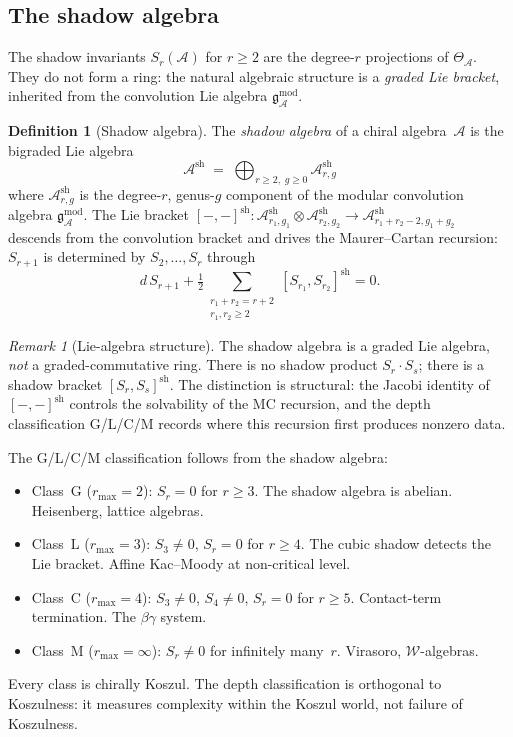 \documentclass[11pt,reqno]{amsart}
\theoremstyle{definition}
\newtheorem{definition}[theorem]{Definition}
\theoremstyle{remark}
\newtheorem{remark}[theorem]{Remark}
\newcommand{\cA}{\mathcal{A}}
\newcommand{\cW}{\mathcal{W}}
\newcommand{\fg}{\mathfrak{g}}
\numberwithin{equation}{section}
\begin{document}
\subsection{The shadow algebra}

The shadow invariants $S_r(\cA)$ for $r \geq 2$ are the
degree-$r$ projections of $\Theta_\cA$. They do not form a ring:
the natural algebraic structure is a \emph{graded Lie bracket},
inherited from the convolution Lie algebra
$\fg^{\mathrm{mod}}_\cA$.

\begin{definition}[Shadow algebra]
\label{def:kfc-shadow-algebra}
The \emph{shadow algebra} of a chiral algebra~$\cA$ is the
bigraded Lie algebra
\[
\cA^{\mathrm{sh}} \;=\;
\bigoplus_{r \geq 2,\; g \geq 0} \cA^{\mathrm{sh}}_{r,g}
\]
where $\cA^{\mathrm{sh}}_{r,g}$ is the degree-$r$, genus-$g$
component of the modular convolution algebra
$\fg^{\mathrm{mod}}_\cA$. The Lie bracket
$[-,-]^{\mathrm{sh}} \colon
\cA^{\mathrm{sh}}_{r_1,g_1} \otimes \cA^{\mathrm{sh}}_{r_2,g_2}
\to \cA^{\mathrm{sh}}_{r_1+r_2-2, g_1+g_2}$
descends from the convolution bracket and drives the
Maurer--Cartan recursion: $S_{r+1}$ is determined by
$S_2, \ldots, S_r$ through
\[
d\,S_{r+1} + \tfrac{1}{2}
\sum_{\substack{r_1 + r_2 = r+2 \\ r_1, r_2 \geq 2}}
[S_{r_1}, S_{r_2}]^{\mathrm{sh}} = 0.
\]
\end{definition}

\begin{remark}[Lie-algebra structure]
\label{warn:kfc-shadow-not-ring}
The shadow algebra is a graded Lie algebra, \emph{not} a
graded-commutative ring. There is no shadow product
$S_r \cdot S_s$; there is a shadow bracket
$[S_r, S_s]^{\mathrm{sh}}$. The distinction is structural:
the Jacobi identity of $[-,-]^{\mathrm{sh}}$ controls the
solvability of the MC recursion, and the depth classification
G/L/C/M records where this recursion first produces nonzero
data.
\end{remark}

The G/L/C/M classification follows from the shadow algebra:
\begin{itemize}
\item Class~G ($r_{\max} = 2$): $S_r = 0$ for $r \geq 3$.
  The shadow algebra is abelian. Heisenberg, lattice algebras.
\item Class~L ($r_{\max} = 3$): $S_3 \neq 0$, $S_r = 0$ for
  $r \geq 4$. The cubic shadow detects the Lie bracket. Affine
  Kac--Moody at non-critical level.
\item Class~C ($r_{\max} = 4$): $S_3 \neq 0$, $S_4 \neq 0$,
  $S_r = 0$ for $r \geq 5$. Contact-term termination. The
  $\beta\gamma$ system.
\item Class~M ($r_{\max} = \infty$): $S_r \neq 0$ for
  infinitely many~$r$. Virasoro, $\cW$-algebras.
\end{itemize}
Every class is chirally Koszul. The depth classification is
orthogonal to Koszulness: it measures complexity within the
Koszul world, not failure of Koszulness.
\end{document}

